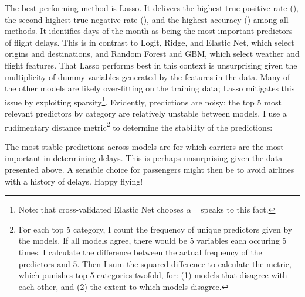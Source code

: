 \documentclass[
]{article}
\begin{document}
The best performing method is Lasso. It delivers the highest true
positive rate (), the second-highest true negative rate (), and the
highest accuracy () among all methods. It identifies days of the month
as being the most important predictors of flight delays. This is in
contrast to Logit, Ridge, and Elastic Net, which select origins and
destinations, and Random Forest and GBM, which select weather and flight
features. That Lasso performs best in this context is unsurprising given
the multiplicity of dummy variables generated by the features in the
data. Many of the other models are likely over-fitting on the training
data; Lasso mitigates this issue by exploiting
sparsity\footnote{Note: that cross-validated Elastic Net chooses $\alpha$= speaks to this fact.}.
Evidently, predictions are noisy: the top 5 most relevant predictors by
category are relatively unstable between models. I use a rudimentary
distance
metric\footnote{For each top 5 category, I count the frequency of unique predictors given by the models. If all models agree, there would be 5 variables each occuring 5 times. I calculate the difference between the actual frequency of the predictors and 5. Then I sum the squared-difference to calculate the metric, which punishes top 5 categories twofold, for: (1) models that disagree with each other, and (2) the extent to which models disagree.}
to determine the stability of the predictions:

The most stable predictions across models are for which carriers are the
most important in determining delays. This is perhaps unsurprising given
the data presented above. A sensible choice for passengers might then be
to avoid airlines with a history of delays. Happy flying!
\end{document}
